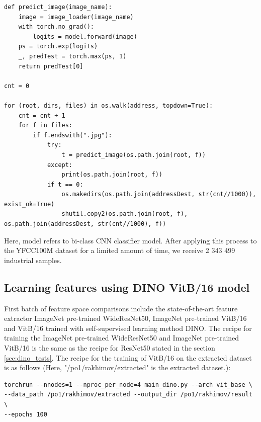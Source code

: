\begin{lstlisting}
def predict_image(image_name):
    image = image_loader(image_name)
    with torch.no_grad():
        logits = model.forward(image)
    ps = torch.exp(logits)
    _, predTest = torch.max(ps, 1)
    return predTest[0]

cnt = 0

for (root, dirs, files) in os.walk(address, topdown=True):
    cnt = cnt + 1
    for f in files:
        if f.endswith(".jpg"):
            try:
                t = predict_image(os.path.join(root, f))
            except:
                print(os.path.join(root, f))
            if t == 0:
                os.makedirs(os.path.join(addressDest, str(cnt//1000)), exist_ok=True)
                shutil.copy2(os.path.join(root, f), os.path.join(addressDest, str(cnt//1000), f))
\end{lstlisting}

Here, model refers to bi-class CNN classifier model. After applying this process to the YFCC100M dataset for a limited amount of time, we receive 2 343 499 industrial samples.

\subsection{Learning features using DINO VitB/16 model}
First batch of feature space comparisons include the state-of-the-art feature extractor ImageNet pre-trained WideResNet50, ImageNet pre-trained VitB/16\cite{vit} and VitB/16 trained with self-supervised learning method DINO\cite{dino}. The recipe for training the ImageNet pre-trained WideResNet50 and ImageNet pre-trained VitB/16 is the same as the recipe for ResNet50 stated in the section \ref{sec:dino_tests}. The recipe for the training of VitB/16 on the extracted dataset is as follows (Here, "/po1/rakhimov/extracted" is the extracted dataset.):

\begin{lstlisting}
torchrun --nnodes=1 --nproc_per_node=4 main_dino.py --arch vit_base \
--data_path /po1/rakhimov/extracted --output_dir /po1/rakhimov/result \ 
--epochs 100
\end{lstlisting}

